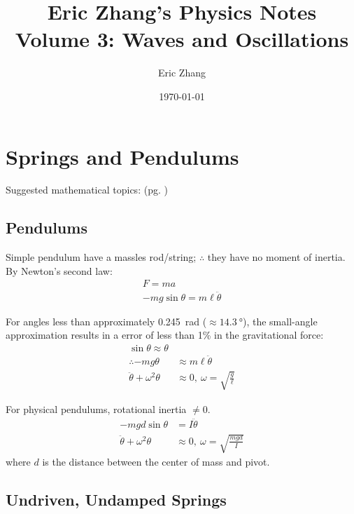 \documentclass[a4paper, titlepage]{book}
\title{
    Eric Zhang's Physics Notes \\
    \large Volume 3: Waves and Oscillations
}
\author{Eric Zhang}
\date{\today}
\begin{document}
\frontmatter
\maketitle
\tableofcontents


\mainmatter

\chapter{Springs and Pendulums}

Suggested mathematical topics:  (pg. \pageref{ch:complex-and-imaginary-numbers})

\section{Pendulums}

Simple pendulum have a massles rod/string;
\(\therefore\) they have no moment of inertia.
By Newton's second law:
\begin{equation}
    \begin{aligned}
        F = ma \\
        -mg \sin \theta = m \ell \ddot{\theta}
    \end{aligned}
\end{equation}

For angles less than approximately \qty{0.245}{\radian} (\(\approx\qty{14.3}{\degree}\)),
the small-angle approximation results in a error of less than 1\% in the gravitational force:
\begin{align}
    \sin\theta \approx \theta \\
    \therefore -mg\theta            &\approx m \ell \ddot{\theta} \\
    \ddot{\theta} + \omega^2 \theta &\approx 0,~\omega = \sqrt{\frac{g}{\ell}}
\end{align}

For physical pendulums, rotational inertia \(\ne 0\).
\begin{align}
    -mgd \sin\theta                &=       I \ddot{\theta} \\
    \ddot{\theta} + \omega^2\theta &\approx 0,~\omega = \sqrt{\frac{mgd}{I}}
\end{align}
where \(d\) is the distance between the center of mass and pivot.

\section{Undriven, Undamped Springs}
\end{document}
